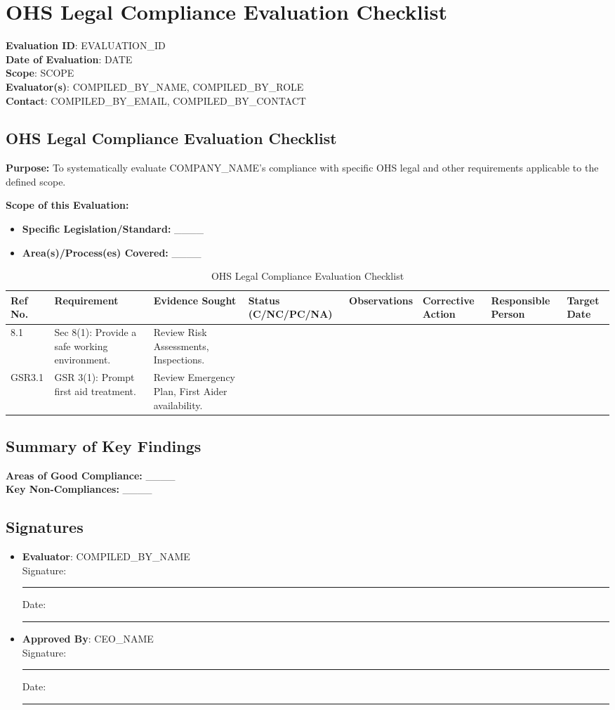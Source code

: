 \documentclass[11pt]{article}
\newcommand{\userCompany}{{{COMPANY_NAME}}}
\newcommand{\docTitle}{OHS Legal Compliance Evaluation Checklist}
\newcommand{\refNumber}{{{EVALUATION_ID}}}
\newcommand{\issueDate}{{{DATE}}}
\newcommand{\scope}{{{SCOPE}}}
\newcommand{\compilerName}{{{COMPILED_BY_NAME}}}
\newcommand{\compilerRole}{{{COMPILED_BY_ROLE}}}
\newcommand{\compilerEmail}{{{COMPILED_BY_EMAIL}}}
\newcommand{\compilerPhone}{{{COMPILED_BY_CONTACT}}}
\begin{document}
\section*{\docTitle}
\textbf{Evaluation ID}: \refNumber \\
\textbf{Date of Evaluation}: \issueDate \\
\textbf{Scope}: \scope \\
\textbf{Evaluator(s)}: \compilerName, \compilerRole \\
\textbf{Contact}: \compilerEmail, \compilerPhone

\subsection*{OHS Legal Compliance Evaluation Checklist}

\textbf{Purpose:} To systematically evaluate \userCompany's compliance with specific OHS legal and other requirements applicable to the defined scope.

\textbf{Scope of this Evaluation:}
\begin{itemize}
    \item \textbf{Specific Legislation/Standard:} \_\_\_\_
    \item \textbf{Area(s)/Process(es) Covered:} \_\_\_\_
\end{itemize}

\begin{table}[h]
    \centering
    \begin{tabular}{p{1cm}p{3cm}p{3cm}p{2cm}p{3cm}p{2cm}p{2cm}p{2cm}}
        \toprule
        \textbf{Ref No.} & \textbf{Requirement} & \textbf{Evidence Sought} & \textbf{Status (C/NC/PC/NA)} & \textbf{Observations} & \textbf{Corrective Action} & \textbf{Responsible Person} & \textbf{Target Date} \\
        \midrule
        8.1 & Sec 8(1): Provide a safe working environment. & Review Risk Assessments, Inspections. & & & & & \\
        GSR3.1 & GSR 3(1): Prompt first aid treatment. & Review Emergency Plan, First Aider availability. & & & & & \\
        \bottomrule
    \end{tabular}
    \caption{OHS Legal Compliance Evaluation Checklist}
\end{table}

\subsection*{Summary of Key Findings}
\textbf{Areas of Good Compliance:} \_\_\_\_ \\
\textbf{Key Non-Compliances:} \_\_\_\_

\subsection*{Signatures}
\begin{itemize}
  \item \textbf{Evaluator}: \compilerName \\
    Signature: \rule{5cm}{0.4pt} \quad Date: \rule{3cm}{0.4pt}
  \item \textbf{Approved By}: {{CEO_NAME}} \\
    Signature: \rule{5cm}{0.4pt} \quad Date: \rule{3cm}{0.4pt}
\end{itemize}
\end{document}
